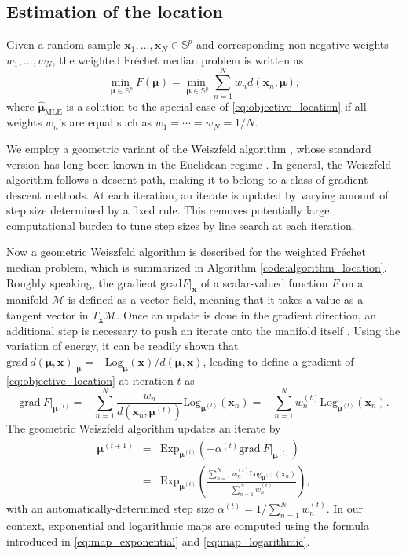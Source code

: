 \documentclass[10pt]{article}
\newcommand{\Exp}{\textrm{Exp}}
\newcommand{\Log}{\textrm{Log}}
\newcommand{\bfx}{\mathbf{x}}
\newcommand{\bfmu}{\boldsymbol{\mu}}
\newcommand{\bbS}{\mathbb{S}}
\newcommand{\calM}{\mathcal{M}}
\newcommand{\mleloc}{\hat{\bfmu}_{\textrm{MLE}}}
\newcommand{\Frechet}{Fr\'{e}chet }
\begin{document}
\subsection{Estimation of the location}

Given a random sample $\bfx_1, \ldots, \bfx_N \in \bbS^p$ and corresponding non-negative weights $w_1, \ldots, w_N$, the weighted \Frechet median problem is written as 
\begin{equation}\label{eq:objective_location}
\underset{\bfmu\in\bbS^p}{\min~} F(\bfmu) = \underset{\bfmu\in\bbS^p}{\min~} \sum_{n=1}^N w_n d(\bfx_n, \bfmu),
\end{equation}
where $\mleloc$ is a solution to the special case of \eqref{eq:objective_location} if all weights $w_n$'s are equal such as $w_1 = \cdots = w_N = 1/N$. 

We employ a geometric variant of the Weiszfeld algorithm \cite{fletcher_2009_GeometricMedianRiemannian}, whose standard version has long been known in the Euclidean regime \cite{weiszfeld_1937_PointPourLequel}. In general, the Weiszfeld algorithm follows a descent path, making it to belong to a class of gradient descent methods. At each iteration, an iterate is updated by varying amount of step size determined by a fixed rule. This removes potentially large computational burden to tune step sizes by line search at each iteration.

Now a geometric Weiszfeld algorithm is described for the weighted \Frechet median problem, which is summarized in Algorithm \ref{code:algorithm_location}. Roughly speaking,  the gradient $\textrm{grad} F\vert_{\bfx}$ of a scalar-valued function $F$ on a manifold $\calM$ is defined as a vector field, meaning that it takes a value as a tangent vector in $T_{\bfx} \calM$. Once an update is done in the gradient direction, an additional step is necessary   to push an iterate onto the manifold itself \cite{absil_2008_OptimizationAlgorithmsMatrix}. Using the variation of energy, it can be readily shown that $\text{grad}~ d(\bfmu, \bfx)\vert_{\bfmu} = -\Log_{\bfmu} (\bfx) / d(\bfmu, \bfx)$, leading to define a gradient of \eqref{eq:objective_location} at iteration $t$ as
\begin{equation*}
\textrm{grad}~ F\vert_{\bfmu^{(t)}} = -\sum_{n=1}^N \frac{w_n}{d(\bfx_n, \bfmu^{(t)})} \Log_{\bfmu^{(t)}} (\bfx_n) =- \sum_{n=1}^N w_n^{(t)} \Log_{\bfmu^{(t)}} (\bfx_n).
\end{equation*}
The geometric Weiszfeld algorithm updates an iterate by 
\begin{eqnarray}
\bfmu^{(t+1)} &=& \Exp_{\bfmu^{(t)}} \left( -\alpha^{(t)}  \textrm{grad}~ F\vert_{\bfmu^{(t)}} \right) \nonumber \\ 
&=& \Exp_{\bfmu^{(t)}} \left(
\frac{\sum_{n=1}^N w_n^{(t)} \Log_{\bfmu^{(t)}}(\bfx_n)}{\sum_{n=1}^N w_n^{(t)}}
\right),\label{eq:update_location_weiszfeld}
\end{eqnarray}
with an automatically-determined step size $\alpha^{(t)}=1/\sum_{n=1}^N w_n^{(t)}$. In our context, exponential and logarithmic maps are computed using the formula introduced in \eqref{eq:map_exponential} and \eqref{eq:map_logarithmic}.
\end{document}
